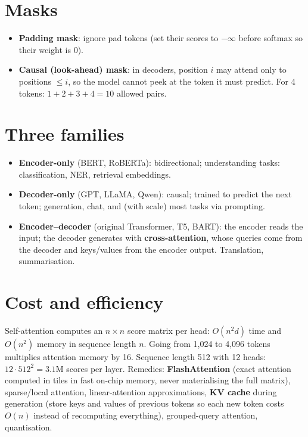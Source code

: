\section{Masks}
\begin{itemize}
\item \textbf{Padding mask}: ignore pad tokens (set their scores to $-\infty$ before softmax so their weight is 0).
\item \textbf{Causal (look-ahead) mask}: in decoders, position $i$ may attend only to positions $\le i$, so the model cannot peek at the token it must predict. For 4
  tokens: $1 + 2 + 3 + 4 = 10$ allowed pairs.
\end{itemize}

\section{Three families}
\begin{itemize}
\item \textbf{Encoder-only} (BERT, RoBERTa): bidirectional; understanding tasks: classification, NER, retrieval embeddings.
\item \textbf{Decoder-only} (GPT, LLaMA, Qwen): causal; trained to predict the next token; generation, chat, and (with scale) most tasks via prompting.
\item \textbf{Encoder--decoder} (original Transformer, T5, BART): the encoder reads the input; the decoder generates with \textbf{cross-attention}, whose queries come from
  the decoder and keys/values from the encoder output. Translation, summarisation.
\end{itemize}

\section{Cost and efficiency}
Self-attention computes an $n\times n$ score matrix per head: $O(n^2d)$ time and $O(n^2)$ memory in sequence length $n$. Going from 1{,}024 to 4{,}096 tokens multiplies
attention memory by 16. Sequence length 512 with 12 heads: $12\cdot512^2 = 3.1$M scores per layer. Remedies: \textbf{FlashAttention} (exact attention computed in tiles
in fast on-chip memory, never materialising the full matrix), sparse/local attention, linear-attention approximations, \textbf{KV cache} during generation (store keys
and values of previous tokens so each new token costs $O(n)$ instead of recomputing everything), grouped-query attention, quantisation.

